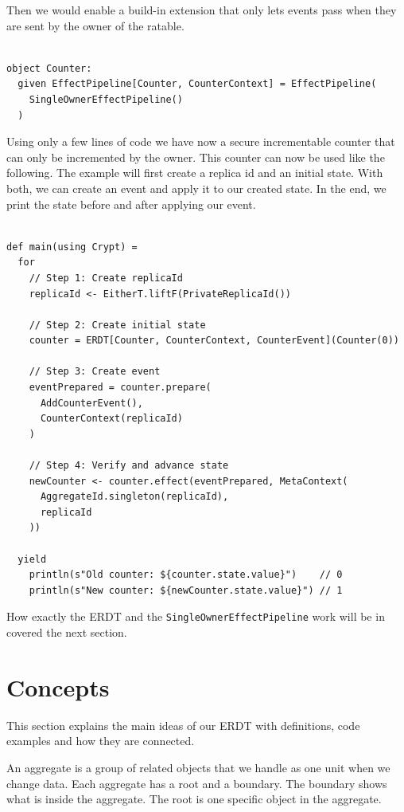 \documentclass[
	english,
	ruledheaders=section,   %
	class=report,		    %
	thesis={type=bachelor}, %
	accentcolor=9c,			%
	custommargins=true,    %
	marginpar=false,        %
	parskip=half-,          %
	fontsize=11pt,          %
]{tudapub}
\begin{document}
Then we would enable a build-in extension that only lets events pass when they are sent by the owner of the ratable.

\begin{lstlisting}

object Counter:
  given EffectPipeline[Counter, CounterContext] = EffectPipeline(
    SingleOwnerEffectPipeline()
  )

\end{lstlisting}

Using only a few lines of code we have now a secure incrementable counter that can only be incremented by the owner. This counter can now be used like the following. The example will first create a replica id and an initial state. With both, we can create an event and apply it to our created state. In the end, we print the state before and after applying our event. 

\begin{lstlisting}
    
def main(using Crypt) = 
  for
    // Step 1: Create replicaId
    replicaId <- EitherT.liftF(PrivateReplicaId())

    // Step 2: Create initial state
    counter = ERDT[Counter, CounterContext, CounterEvent](Counter(0))

    // Step 3: Create event
    eventPrepared = counter.prepare(
      AddCounterEvent(),
      CounterContext(replicaId)
    )

    // Step 4: Verify and advance state
    newCounter <- counter.effect(eventPrepared, MetaContext(
      AggregateId.singleton(replicaId), 
      replicaId
    ))

  yield
    println(s"Old counter: ${counter.state.value}")    // 0
    println(s"New counter: ${newCounter.state.value}") // 1

\end{lstlisting}

How exactly the ERDT and the \texttt{SingleOwnerEffectPipeline} work will be in covered the next section.

\section{Concepts}

This section explains the main ideas of our ERDT with definitions, code examples and how they are connected.


An aggregate is a group of related objects that we handle as one unit when we change data. Each aggregate has a root and a boundary. The boundary shows what is inside the aggregate. The root is one specific object in the aggregate. 
\end{document}
